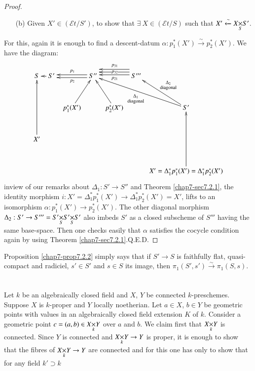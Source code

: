 \begin{proof}
\begin{itemize}
\item[(b)] Given $X'\in(\mathscr{E}t/S')$, to show that $\exists\
  X\in(\mathscr{E}t/S)$ such that
  $X'\xleftarrow{\sim}\fprod{X}{S'}{S}$. 
\end{itemize}

For this, again it is enough to find a descent-datum
$\alpha:p^{\ast}_{1}(X')\xrightarrow{\sim}p^{\ast}_{2}(X')$. We have
the diagram:
\[
\xymatrix@C=.2cm@R=1.1cm{
S & \ar[l]S' && \ar@<-.2em>[ll]_{p_{1}}\ar@<.2em>[ll]^{p_{2}} S'' && S'''\ar@<-1em>[ll]_{p_{31}}\ar@<-.6em>[ll]|{p_{32}}\ar@<-.2em>[ll]^{p_{21}} & \\
 & & p^{\ast}_{1}(X')\ar[ur] & & p^{\ast}_{2}(X')\ar[ul] & & S'\ar[ulll]^{\begin{smallmatrix}\Delta_{1}\\{\text{diagonal}}\end{smallmatrix}}\ar[ul]_{\begin{smallmatrix}\Delta_{2}\\{\text{diagonal}}\end{smallmatrix}}\\
X'\ar[uu] & & & & & & \\
 & & & & & &
\ar[uu]X'=\Delta^{\ast}_{1}p^{\ast}_{1}(X')=\Delta^{\ast}_{1}p^{\ast}_{2}(X')
}
\]
in\pageoriginale view of our remarks about $\Delta_{1}:S'\to S''$ and
Theorem \ref{chap7-sec7.2.1}, the identity morphism
$i:X'=\Delta^{\ast}_{1}p^{\ast}_{1}(X')\to
\Delta^{\ast}_{1}p^{\ast}_{2}(X')=X'$, lifts to an isomorphism
$\alpha:p^{\ast}_{1}(X')\to p^{\ast}_{2}(X')$. The other diagonal
morphism $\Delta_{2}:S'\to S'''=\fprod{S'}{\fprod{S'}{S'}{S}}{S}$ also
imbeds $S'$ as a closed subscheme of $S'''$ having the same
base-space. Then one checks easily that $\alpha$ satisfies the cocycle
condition again by using Theorem \ref{chap7-sec7.2.1}.\hfill Q.E.D.
\end{proof}

Proposition \ref{chap7-prop7.2.2} simply says that if $S'\to S$ is
faithfully flat, quasi-compact and radiciel, $s'\in S'$ and $s\in S$
its image, then $\pi_{1}(S',s')\xrightarrow{\sim}\pi_{1}(S,s)$.

\section{}\label{chap7-sec7.3}
Let $k$ be an algebraically closed field and $X$, $Y$ be connected
$k$-presche\-mes. Suppose $X$ is $k$-proper and $Y$ locally
noetherian. Let $a\in X$, $b\in Y$ be geometric points with values in
an algebraically closed field extension $K$ of $k$. Consider a
geometric point $c=(a,b)\in \fprod{X}{Y}{k}$ over $a$ and $b$. We
claim first that $\fprod{X}{Y}{k}$ is connected. Since $Y$ is
connected and $\fprod{X}{Y}{k}\to Y$ is proper, it is enough to show
that the fibres of $\fprod{X}{Y}{k}\to Y$ are connected and for this
one has only to show that for any field $k'\supset k$

